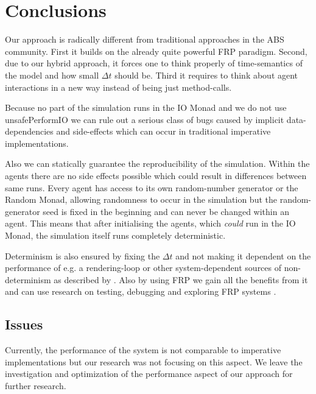 \section{Conclusions}
\label{sec:conclusions}

Our approach is radically different from traditional approaches in the ABS community. First it builds on the already quite powerful FRP paradigm. Second, due to our hybrid approach, it forces one to think properly of time-semantics of the model and how small $\Delta t$ should be. Third it requires to think about agent interactions in a new way instead of being just method-calls.

Because no part of the simulation runs in the IO Monad and we do not use unsafePerformIO we can rule out a serious class of bugs caused by implicit data-dependencies and side-effects which can occur in traditional imperative implementations.

Also we can statically guarantee the reproducibility of the simulation. Within the agents there are no side effects possible which could result in differences between same runs. Every agent has access to its own random-number generator or the Random Monad, allowing randomness to occur in the simulation but the random-generator seed is fixed in the beginning and can never be changed within an agent. This means that after initialising the agents, which \textit{could} run in the IO Monad, the simulation itself runs completely deterministic.

Determinism is also ensured by fixing the $\Delta t$ and not making it dependent on the performance of e.g. a rendering-loop or other system-dependent sources of non-determinism as described by \cite{perez_testing_2017}. Also by using FRP we gain all the benefits from it and can use research on testing, debugging and exploring FRP systems \cite{perez_testing_2017, perez_back_2017}.

\subsection*{Issues}
Currently, the performance of the system is not comparable to imperative implementations but our research was not focusing on this aspect. We leave the investigation and optimization of the performance aspect of our approach for further research.

